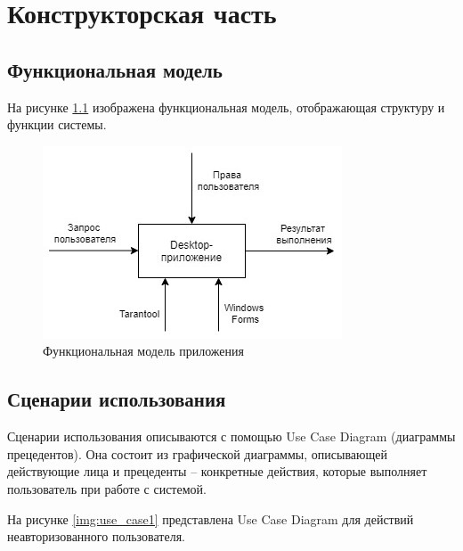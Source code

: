 \chapter{Конструкторская часть}

\section{Функциональная модель}

На рисунке \ref{img:func_model} изображена функциональная модель, отображающая структуру и функции системы.

\begin{figure}[h!]
	\begin{center}
		\includegraphics[scale=0.7]{../imgs/func_model.jpg}
	\end{center}
	\captionsetup{justification=centering}
	\caption{Функциональная модель приложения}
	\label{img:func_model}
\end{figure}






\section{Сценарии использования}

Сценарии использования описываются с помощью Use Case Diagram (диаграммы прецедентов). Она состоит из графической диаграммы, описывающей действующие лица и прецеденты – конкретные действия, которые выполняет пользователь при работе с системой.

\clearpage
На рисунке \ref{img:use_case1} представлена Use Case Diagram для действий неавторизованного пользователя.


